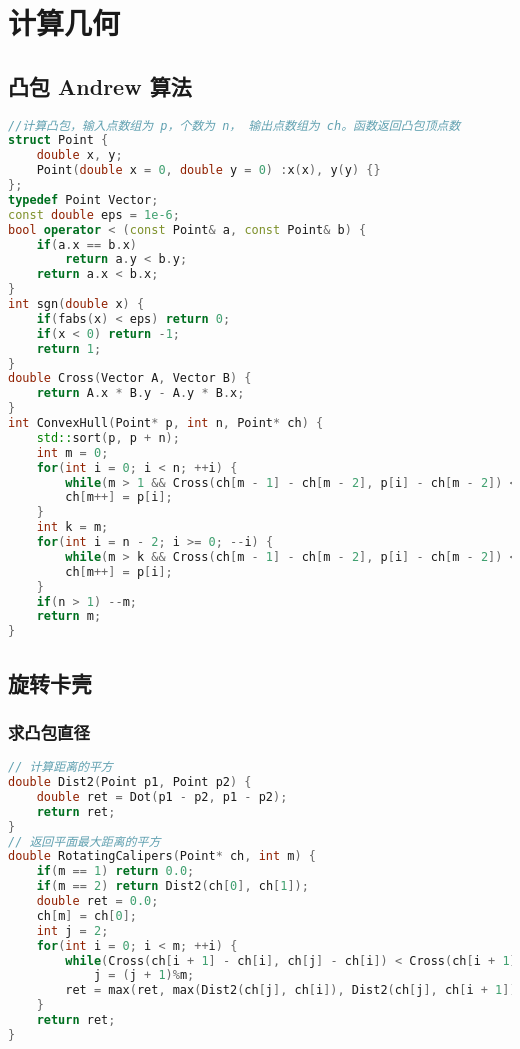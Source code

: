 

\section{计算几何}

\subsection{凸包 Andrew 算法}

\begin{lstlisting}[language=C++]
//计算凸包，输入点数组为 p，个数为 n， 输出点数组为 ch。函数返回凸包顶点数
struct Point {
    double x, y;
    Point(double x = 0, double y = 0) :x(x), y(y) {}
};
typedef Point Vector;
const double eps = 1e-6;
bool operator < (const Point& a, const Point& b) {
    if(a.x == b.x)
        return a.y < b.y;
    return a.x < b.x;
}
int sgn(double x) {
    if(fabs(x) < eps) return 0;
    if(x < 0) return -1;
    return 1;
}
double Cross(Vector A, Vector B) {
    return A.x * B.y - A.y * B.x;
}
int ConvexHull(Point* p, int n, Point* ch) {
    std::sort(p, p + n);
    int m = 0;
    for(int i = 0; i < n; ++i) {
        while(m > 1 && Cross(ch[m - 1] - ch[m - 2], p[i] - ch[m - 2]) < 0) --m;
        ch[m++] = p[i];
    }
    int k = m;
    for(int i = n - 2; i >= 0; --i) {
        while(m > k && Cross(ch[m - 1] - ch[m - 2], p[i] - ch[m - 2]) < 0) --m;
        ch[m++] = p[i];
    }
    if(n > 1) --m;
    return m;
}
\end{lstlisting}

\subsection{旋转卡壳}

\subsubsection{求凸包直径}

\begin{lstlisting}[language=C++]
// 计算距离的平方
double Dist2(Point p1, Point p2) { 
    double ret = Dot(p1 - p2, p1 - p2);
    return ret;
}
// 返回平面最大距离的平方
double RotatingCalipers(Point* ch, int m) {
    if(m == 1) return 0.0;
    if(m == 2) return Dist2(ch[0], ch[1]);
    double ret = 0.0;
    ch[m] = ch[0];
    int j = 2;
    for(int i = 0; i < m; ++i) {
        while(Cross(ch[i + 1] - ch[i], ch[j] - ch[i]) < Cross(ch[i + 1] - ch[i], ch[j + 1] - ch[i]))
            j = (j + 1)%m;
        ret = max(ret, max(Dist2(ch[j], ch[i]), Dist2(ch[j], ch[i + 1])));
    }
    return ret;
}   
\end{lstlisting}

